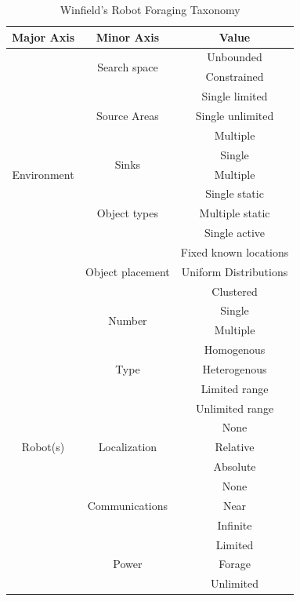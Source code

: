 \begin{table}
\centering
    \caption{Winfield's Robot Foraging Taxonomy \cite{winfield2009foraging}}
    \label{foragingtaxonomytable_part1}
    
\begin{tabular}{ | c | c | c |}
	\hline
	Major Axis & Minor Axis & Value  \\ \hline
	\multirow{13}{*}{Environment}
		& \multirow{2}{*}{Search space} 
			& Unbounded \\  
		& 	& Constrained \\ \cline{2-3}
		& \multirow{3}{*}{Source Areas} 
			& Single limited \\ 
		&	& Single unlimited \\
		&	& Multiple \\ \cline{2-3}
		& \multirow{2}{*}{Sinks} 
			& Single \\
		&	& Multiple \\ \cline{2-3}
		& \multirow{3}{*}{Object types} 
			& Single static \\
		&	& Multiple static \\
		&	& Single active \\ \cline{2-3}
		& \multirow{3}{*}{Object placement} 
			& Fixed known locations \\
		&	& Uniform Distributions \\
		&	& Clustered \\\hline
	\multirow{16}{*}{Robot(s)}
		& \multirow{2}{*}{Number} 
			& Single \\  
		& 	& Multiple \\ \cline{2-3}
		& \multirow{3}{*}{Type} 
			& Homogenous \\ 
		&	& Heterogenous \\ \cline{2-3}
		& \multirow{2}{*}{Object Sensing} 
			& Limited range \\
		&	& Unlimited range\\ \cline{2-3}
		& \multirow{3}{*}{Localization} 
			& None \\
		&	& Relative \\
		&	& Absolute \\ \cline{2-3}
		& \multirow{3}{*}{Communications} 
			& None \\
		&	& Near \\
		&	& Infinite \\\cline{2-3}
		& \multirow{3}{*}{Power} 
			& Limited \\
		&	& Forage \\
		&	& Unlimited \\\hline
\end{tabular}
\end{table}

